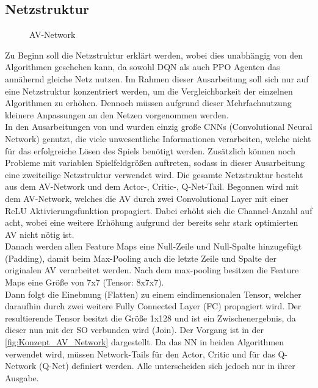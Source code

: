 \subsection{Netzstruktur} \label{subsec:Konzept_Netzstruktur}
\begin{wrapfigure}{r}{4.0cm}
	\centering
	\captionsetup{format=myformat, labelsep=newline}
	

	\caption[AV-Network]{AV-Network}

	\label{fig:Konzept_AV_Network}
\end{wrapfigure}
Zu Beginn soll die Netzstruktur erklärt werden, wobei dies unabhängig von den Algorithmen geschehen kann, da sowohl DQN als auch PPO Agenten das annähernd gleiche Netz nutzen.
Im Rahmen dieser Ausarbeitung soll sich nur auf eine Netzstruktur konzentriert werden, um die Vergleichbarkeit der einzelnen Algorithmen zu erhöhen. Dennoch müssen aufgrund dieser Mehrfachnutzung kleinere Anpassungen an den Netzen vorgenommen werden.\\
In den Ausarbeitungen von \citep{Autonomous_Agents_in_Snake_Game_via_DRL} und \citep{UAV} wurden einzig große CNNs (Convolutional Neural Network) genutzt,
die viele unwesentliche Informationen verarbeiten, welche nicht für das erfolgreiche Lösen des Spiels benötigt werden.
Zusätzlich können noch Probleme mit variablen Spielfeldgrößen auftreten, sodass in dieser Ausarbeitung eine zweiteilige Netzstruktur verwendet wird. 
Die gesamte Netzstruktur besteht aus dem AV-Network und dem Actor-, Critic-, Q-Net-Tail.
Begonnen wird mit dem AV-Network, welches die AV durch zwei Convolutional Layer mit einer ReLU Aktivierungsfunktion propagiert. Dabei erhöht sich die Channel-Anzahl auf acht, wobei eine weitere Erhöhung aufgrund der bereits sehr stark optimierten AV nicht nötig ist.\\  
Danach werden allen Feature Maps eine Null-Zeile und Null-Spalte hinzugefügt (Padding), damit beim Max-Pooling auch die letzte Zeile und Spalte der originalen AV verarbeitet werden. Nach dem max-pooling besitzen die Feature Maps eine Größe von 7x7 (Tensor: 8x7x7).\\ 
Dann folgt die Einebnung (Flatten) zu einem eindimensionalen Tensor, welcher daraufhin durch zwei weitere Fully Connected Layer (FC) propagiert wird. Der resultierende Tensor besitzt die Größe 1x128 und ist ein Zwischenergebnis, da dieser nun mit der SO verbunden wird (Join). Der Vorgang ist in der \autoref{fig:Konzept_AV_Network} dargestellt.
Da das NN in beiden Algorithmen verwendet wird, müssen Network-Tails für den Actor, Critic und für das Q-Network (Q-Net) definiert werden. Alle unterscheiden sich jedoch nur in ihrer Ausgabe. 
